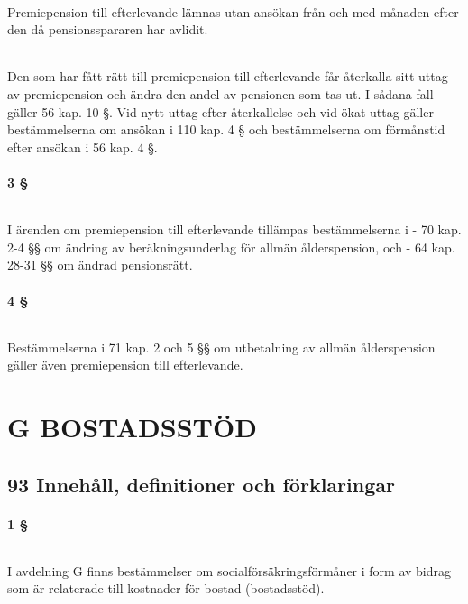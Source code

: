 \documentclass[a4paper,notitlepage,openany,10pt]{book}
\begin{document}
\paragraph*{}
Premiepension till efterlevande lämnas utan ansökan från och med månaden efter den då pensionsspararen har avlidit.
\paragraph*{}
Den som har fått rätt till premiepension till efterlevande får återkalla sitt uttag av premiepension och ändra den andel av pensionen som tas ut. I sådana fall gäller 56 kap. 10 §.
Vid nytt uttag efter återkallelse och vid ökat uttag gäller bestämmelserna om ansökan i 110 kap. 4 § och bestämmelserna om förmånstid efter ansökan i 56 kap. 4 §.
\subsection*{3 §}
\paragraph*{}
I ärenden om premiepension till efterlevande tillämpas bestämmelserna i
\newline - 70 kap. 2-4 §§ om ändring av beräkningsunderlag för allmän ålderspension, och
\newline - 64 kap. 28-31 §§ om ändrad pensionsrätt.
\subsection*{4 §}
\paragraph*{}
Bestämmelserna i 71 kap. 2 och 5 §§ om utbetalning av allmän ålderspension gäller även premiepension till efterlevande.
\part*{G BOSTADSSTÖD}
\chapter*{93 Innehåll, definitioner och förklaringar}
\subsection*{1 §}
\paragraph*{}
I avdelning G finns bestämmelser om socialförsäkringsförmåner i form av bidrag som är relaterade till kostnader för bostad (bostadsstöd).
\end{document}
